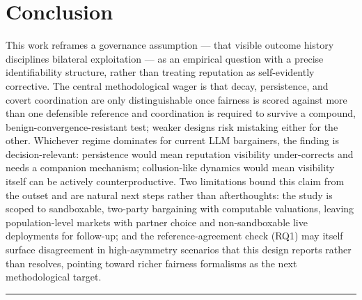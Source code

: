 \documentclass[11pt]{article}
\begin{document}
\section{Conclusion}

This work reframes a governance assumption --- that visible outcome history disciplines bilateral exploitation --- as an empirical question with a precise identifiability structure, rather than treating reputation as self-evidently corrective. The central methodological wager is that decay, persistence, and covert coordination are only distinguishable once fairness is scored against more than one defensible reference and coordination is required to survive a compound, benign-convergence-resistant test; weaker designs risk mistaking either for the other. Whichever regime dominates for current LLM bargainers, the finding is decision-relevant: persistence would mean reputation visibility under-corrects and needs a companion mechanism; collusion-like dynamics would mean visibility itself can be actively counterproductive. Two limitations bound this claim from the outset and are natural next steps rather than afterthoughts: the study is scoped to sandboxable, two-party bargaining with computable valuations, leaving population-level markets with partner choice and non-sandboxable live deployments for follow-up; and the reference-agreement check (RQ1) may itself surface disagreement in high-asymmetry scenarios that this design reports rather than resolves, pointing toward richer fairness formalisms as the next methodological target.




\vspace{1em}
\hrule
\vspace{1em}
\end{document}
